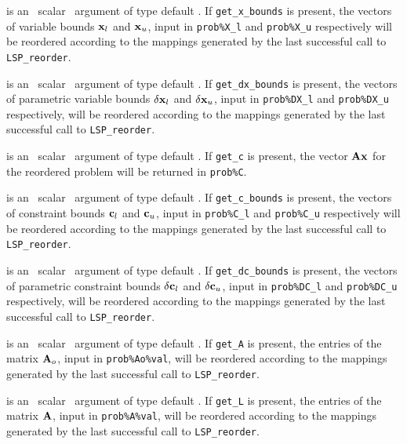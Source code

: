 \documentclass{galahad}
\newcommand{\packagename}{LSP}
\begin{document}
\begin{description}
is an \optional\ scalar \intentin\ argument of type default \logical.
If {\tt get\_x\_bounds} is present,
the vectors of variable bounds ${\mathbf{x}}_l$ and
${\mathbf{x}}_u$, input in {\tt prob\%X\_l} and {\tt prob\%X\_u} respectively
will be reordered according to the
mappings generated by the last successful call to {\tt \packagename\_reorder}.

is an \optional\ scalar \intentin\ argument of type default \logical.
If {\tt get\_dx\_bounds} is present,
the vectors of parametric variable bounds $\delta {\mathbf{x}}_l$ and
$\delta {\mathbf{x}}_u$, input in {\tt prob\%DX\_l} and {\tt prob\%DX\_u} respectively,
will be reordered according to the
mappings generated by the last successful call to {\tt \packagename\_reorder}.

is an \optional\ scalar \intentin\ argument of type default \logical.
If {\tt get\_c} is present, the vector ${\mathbf{A}} {\mathbf{x}}$ for the reordered problem
will be returned in {\tt prob\%C}.

is an \optional\ scalar \intentin\ argument of type default \logical.
If {\tt get\_c\_bounds} is present,
the vectors of constraint bounds ${\mathbf{c}}_l$ and
${\mathbf{c}}_u$, input in {\tt prob\%C\_l} and {\tt prob\%C\_u} respectively
will be reordered according to the
mappings generated by the last successful call to {\tt \packagename\_reorder}.

is an \optional\ scalar \intentin\ argument of type default \logical.
If {\tt get\_dc\_bounds} is present,
the vectors of parametric constraint bounds $\delta {\mathbf{c}}_l$ and
$\delta {\mathbf{c}}_u$, input in {\tt prob\%DC\_l} and {\tt prob\%DC\_u} respectively,
will be reordered according to the
mappings generated by the last successful call to {\tt \packagename\_reorder}.

is an \optional\ scalar \intentin\ argument of type default \logical.
If {\tt get\_A} is present, the entries of the
matrix ${\mathbf{A}}_o$, input in {\tt prob\%Ao\%val}, will be reordered according
to the
mappings generated by the last successful call to {\tt \packagename\_reorder}.

is an \optional\ scalar \intentin\ argument of type default \logical.
If {\tt get\_L} is present, the entries of the
matrix ${\mathbf{A}}$, input in {\tt prob\%A\%val}, will be reordered according to the
mappings generated by the last successful call to {\tt \packagename\_reorder}.

\end{description}
\end{document}
